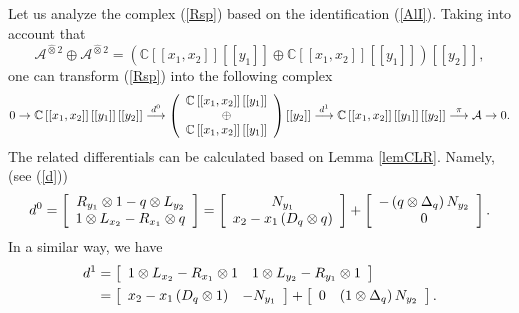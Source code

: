 \documentclass[12pt,reqno]{amsart}%
\theoremstyle{plain}
\numberwithin{theorem}{section} \numberwithin{equation}{section}
\numberwithin{lemma}{section}
\numberwithin{remark}{section}
\numberwithin{example}{section}
\numberwithin{proposition}{section}
\numberwithin{definition}{section}
\numberwithin{corollary}{section}
\begin{document}
Let us analyze the complex (\ref{Rsp}) based on the identification
(\ref{AlI}). Taking into account that
\[
\mathcal{A}^{\widehat{\otimes}2}\oplus\mathcal{A}^{\widehat{\otimes}2}=\left(
\mathbb{C}\left[  \left[  x_{1},x_{2}\right]  \right]  \left[  \left[
y_{1}\right]  \right]  \oplus\mathbb{C}\left[  \left[  x_{1},x_{2}\right]
\right]  \left[  \left[  y_{1}\right]  \right]  \right)  \left[  \left[
y_{2}\right]  \right]  ,
\]
one can transform (\ref{Rsp}) into the following complex
\[
0\rightarrow\mathbb{C}\left[  \left[  x_{1},x_{2}\right]  \right]  \left[
\left[  y_{1}\right]  \right]  \left[  \left[  y_{2}\right]  \right]
\overset{d^{0}}{\longrightarrow}\left(
\begin{array}
[c]{c}%
\mathbb{C}\left[  \left[  x_{1},x_{2}\right]  \right]  \left[  \left[
y_{1}\right]  \right] \\
\oplus\\
\mathbb{C}\left[  \left[  x_{1},x_{2}\right]  \right]  \left[  \left[
y_{1}\right]  \right]
\end{array}
\right)  \left[  \left[  y_{2}\right]  \right]  \overset{d^{1}%
}{\longrightarrow}\mathbb{C}\left[  \left[  x_{1},x_{2}\right]  \right]
\left[  \left[  y_{1}\right]  \right]  \left[  \left[  y_{2}\right]  \right]
\overset{\pi}{\longrightarrow}\mathcal{A}\rightarrow0.
\]
The related differentials can be calculated based on Lemma \ref{lemCLR}.
Namely, (see (\ref{d}))%
\[
d^{0}=\left[
\begin{array}
[c]{c}%
R_{y_{1}}\otimes1-q\otimes L_{y_{2}}\\
1\otimes L_{x_{2}}-R_{x_{1}}\otimes q
\end{array}
\right]  =\left[
\begin{array}
[c]{c}%
N_{y_{1}}\\
x_{2}-x_{1}\left(  D_{q}\otimes q\right)
\end{array}
\right]  +\left[
\begin{array}
[c]{c}%
-\left(  q\otimes\Delta_{q}\right)  N_{y_{2}}\\
0
\end{array}
\right]  .
\]
In a similar way, we have%
\begin{align*}
d^{1}  &  =\left[
\begin{array}
[c]{cc}%
1\otimes L_{x_{2}}-R_{x_{1}}\otimes1 & 1\otimes L_{y_{2}}-R_{y_{1}}\otimes1
\end{array}
\right] \\
&  =\left[
\begin{array}
[c]{cc}%
x_{2}-x_{1}\left(  D_{q}\otimes1\right)  & -N_{y_{1}}%
\end{array}
\right]  +\left[
\begin{array}
[c]{cc}%
0 & \left(  1\otimes\Delta_{q}\right)  N_{y_{2}}%
\end{array}
\right]  .
\end{align*}
\end{document}
